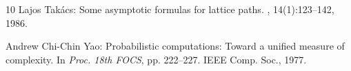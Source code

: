 \documentclass[11pt]{article}
\numberwithin{equation}{section}
\theoremstyle{definition}
\theoremstyle{plain}
\begin{document}
\begin{thebibliography}{10}
{\sc Lajos Tak\'{a}cs}: Some asymptotic formulas for lattice paths.
, 14(1):123--142, 1986.
\newblock [\epfmtdoi{10.1016/0378-3758(86)90016-9}]

{\sc Andrew Chi-Chin Yao}: Probabilistic computations: Toward a unified measure
  of complexity.
\newblock In {\em Proc. 18th FOCS}, pp. 222--227. IEEE Comp. Soc., 1977.

\end{thebibliography}
\end{document}
